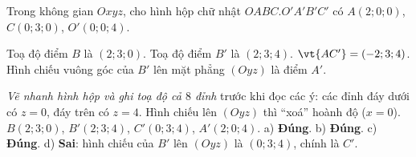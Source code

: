 \begin{viduds}
Trong không gian $Oxyz$, cho hình hộp chữ nhật $OABC.O'A'B'C'$ có $A(2;0;0)$, $C(0;3;0)$, $O'(0;0;4)$.
\begin{dungsai}
  \y Toạ độ điểm $B$ là $(2;3;0)$. \oDS
  \y Toạ độ điểm $B'$ là $(2;3;4)$. \oDS
  \y $\vt{AC'}=(-2;3;4)$. \oDS
  \y Hình chiếu vuông góc của $B'$ lên mặt phẳng $(Oyz)$ là điểm $A'$. \oDS
\end{dungsai}
\begin{loigiai}
\tuduy \emph{Vẽ nhanh hình hộp và ghi toạ độ cả $8$ đỉnh} trước khi đọc các ý: các đỉnh đáy dưới có $z=0$, đáy trên có $z=4$. Hình chiếu lên $(Oyz)$ thì ``xoá'' hoành độ ($x=0$).
\giai $B(2;3;0)$, $B'(2;3;4)$, $C'(0;3;4)$, $A'(2;0;4)$. a) \textbf{Đúng}. b) \textbf{Đúng}. c) \textbf{Đúng}. d) \textbf{Sai}: hình chiếu của $B'$ lên $(Oyz)$ là $(0;3;4)$, chính là $C'$.
\end{loigiai}
\end{viduds}

